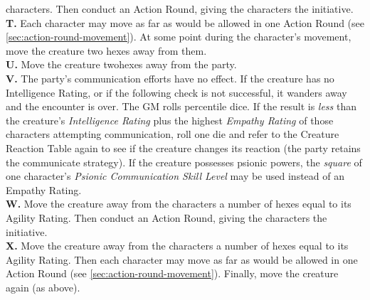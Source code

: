 \begin{table}[htbp]
{\begin{minipage}{0.95\textwidth}
\begin{minipage}{0.95\textwidth}
\begin{multicols}{2}
          characters.  Then conduct an Action Round, giving the
          characters the
          initiative.\\
          \textbf{T.} Each character may move as far as would be allowed
          in one Action Round (see \ref{sec:action-round-movement}). At
          some point during the character's movement, move the creature
          two hexes away from
          them.\\
          \textbf{U.} Move the creature twohexes away from the party.\\
          \textbf{V.} The party's communication efforts have no effect.
          If the creature has no Intelligence Rating, or if the
          following check is not successful, it wanders away and the
          encounter is over. The GM rolls percentile dice. If the result
          is \emph{less} than the creature's \emph{Intelligence Rating}
          plus the highest \emph{Empathy Rating} of those characters
          attempting communication, roll one die and refer to the
          Creature Reaction Table again to see if the creature changes
          its reaction (the party retains the communicate strategy). If
          the creature possesses psionic powers, the \emph{square} of
          one character's \emph{Psionic Communication
            Skill Level} may be used instead of an Empathy Rating.\\
          \textbf{W.} Move the creature away from the characters a
          number of hexes equal to its Agility Rating. Then conduct an
          Action
          Round, giving the characters the initiative.\\
          \textbf{X.} Move the creature away from the characters a
          number of hexes equal to its Agility Rating. Then each
          character may move as far as would be allowed in one Action
          Round (see
          \ref{sec:action-round-movement}). Finally, move the creature
          again (as above).
      \end{multicols}
    \end{minipage}

    \medskip
  \end{minipage}}
\end{table}


